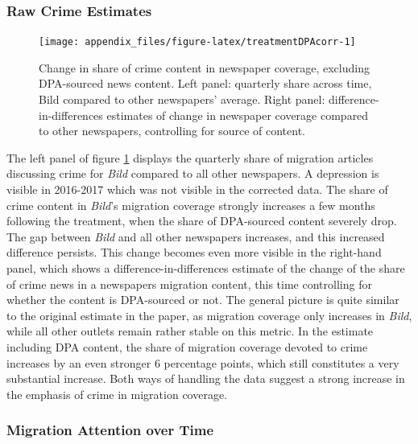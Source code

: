 \documentclass[
]{article}
\begin{document}
\pagebreak

\hypertarget{raw-crime-estimates}{%
\subsubsection{Raw Crime Estimates}\label{raw-crime-estimates}}

\begin{figure}[!htp]

{\centering \texttt{[image: appendix\_files/figure-latex/treatmentDPAcorr-1]} 

}

\caption{Change in share of crime content in newspaper coverage, excluding DPA-sourced news content. Left panel: quarterly share across time, Bild compared to other newspapers' average. Right panel: difference-in-differences estimates of change in newspaper coverage compared to other newspapers, controlling for source of content.}\label{fig:treatmentDPAcorr}
\end{figure}

The left panel of figure \ref{fig:treatmentDPAcorr} displays the quarterly share of migration articles discussing crime for \emph{Bild} compared to all other newspapers. A depression is visible in 2016-2017 which was not visible in the corrected data. The share of crime content in \emph{Bild}'s migration coverage strongly increases a few months following the treatment, when the share of DPA-sourced content severely drop. The gap between \emph{Bild} and all other newspapers increases, and this increased difference persists. This change becomes even more visible in the right-hand panel, which shows a difference-in-differences estimate of the change of the share of crime news in a newspapers migration content, this time controlling for whether the content is DPA-sourced or not. The general picture is quite similar to the original estimate in the paper, as migration coverage only increases in \emph{Bild}, while all other outlets remain rather stable on this metric. In the estimate including DPA content, the share of migration coverage devoted to crime increases by an even stronger 6 percentage points, which still constitutes a very substantial increase. Both ways of handling the data suggest a strong increase in the emphasis of crime in migration coverage.

\pagebreak

\hypertarget{migration-attention-over-time}{%
\subsubsection{Migration Attention over Time}\label{migration-attention-over-time}}
\end{document}

